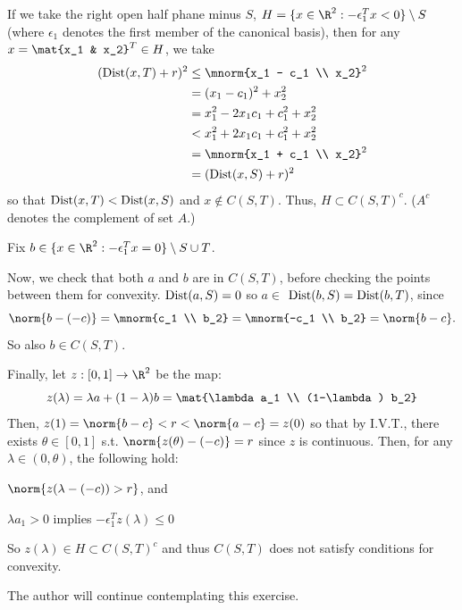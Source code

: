 \documentclass{homework}
\begin{document}
\begin{letterenum}
        If we take the right open half phane minus $S$,
        $H = \{x \in \R^2: -\epsilon_1^T x < 0\} \setminus S$
        (where $\epsilon_1$ denotes the first member of the canonical basis),
        then for any $x=\mat{x_1 & x_2}^T \in H$, we take
        \begin{align}
            (\dist(x, T) + r)^2 &\leq \mnorm{x_1 - c_1 \\ x_2}^2 \\
                &= (x_1 - c_1)^2 + x_2^2 \\
                &= x_1^2 - 2x_1c_1 + c_1^2 + x_2^2 \\
                &< x_1^2 + 2x_1c_1 + c_1^2 + x_2^2 \\
                &= \mnorm{x_1 + c_1 \\ x_2}^2 \\
                &= (\dist(x, S) + r)^2
        \end{align}
        so that $\text{Dist}(x, T) < \text{Dist}(x, S)$ and $x \notin C(S, T)$.
        Thus, $H \subset C(S, T)^c$. ($A^c$ denotes the complement of set $A$.)

        Fix $b \in \{x \in \R^2: -\epsilon_1^T x = 0\} \setminus S\cup T$.

        Now, we check that both $a$ and $b$ are in $C(S, T)$, before checking
        the points between them for convexity. $\text{Dist}(a, S) = 0$ so $a\in$ 
        $\text{Dist}(b, S) = \text{Dist}(b, T)$, since
        \begin{equation}
            \norm{b - (-c)} = \mnorm{c_1 \\ b_2}
                = \mnorm{-c_1 \\ b_2} = \norm{b - c}.
        \end{equation}
        So also $b\in C(S, T)$.

        Finally, let $z: [0, 1] \to \R^2$ be the map:
        \begin{equation}
            z(\lambda) = \lambda a + (1 - \lambda)b =
                \mat{\lambda a_1 \\ (1-\lambda) b_2}
        \end{equation}
        Then, $z(1) = \norm{b - c} < r < \norm{a - c} = z(0)$ so that by
        I.V.T., there exists $\theta \in [0, 1]$ s.t. $\norm{z(\theta) - (-c)} = r$
        since $z$ is continuous. Then, for any $\lambda \in (0, \theta)$,
        the following hold:
        \begin{letterenum}
            \item $\norm{z(\lambda - (-c)) > r}$, and
            \item $\lambda a_1 > 0$ implies $-\epsilon_1^T z(\lambda) \leq 0$
        \end{letterenum}
        So $z(\lambda) \in H \subset C(S,T)^c$ and thus $C(S,T)$ does not
        satisfy conditions for convexity.

    \item The author will continue contemplating this exercise.


\end{letterenum}
\end{document}
